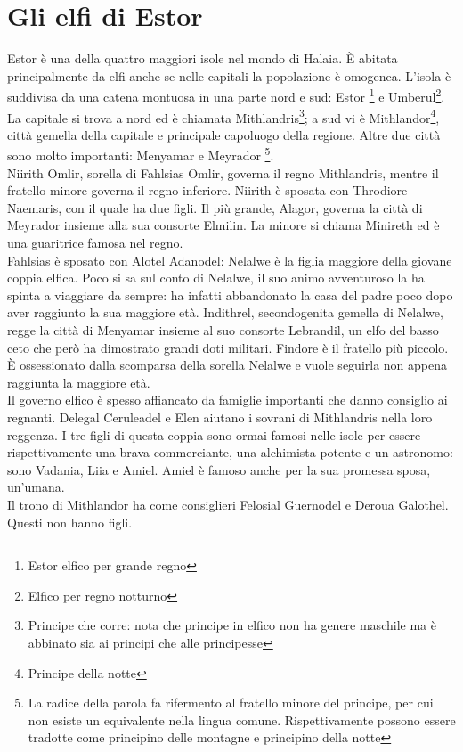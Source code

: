 \documentclass[10pt,twoside,twocolumn]{article}
\begin{document}
\section{Gli elfi di Estor}
Estor \`e una della quattro maggiori isole nel mondo di Halaia. \`E abitata
principalmente da elfi anche se nelle capitali la popolazione \`e omogenea.
L'isola \`e suddivisa da una catena montuosa in una parte nord e sud: Estor
\footnote{Estor elfico per grande regno}
e Umberul\footnote{Elfico per regno notturno}. La capitale si trova a nord
ed \`e chiamata Mithlandris\footnote{Principe che corre: nota che principe in elfico
non ha genere maschile ma \`e abbinato sia ai principi che alle principesse}; a sud
vi \`e Mithlandor\footnote{Principe della notte}, citt\`a gemella
della capitale e principale capoluogo della regione.
Altre due citt\`a sono molto importanti: Menyamar e Meyrador
\footnote{La radice della parola fa rifermento al fratello minore del
  principe, per cui non esiste un equivalente nella lingua comune.
  Rispettivamente possono essere tradotte come principino delle montagne
  e principino della notte}.\\
Niirith Omlir, sorella di Fahlsias Omlir, governa il regno Mithlandris, mentre
il fratello minore governa il regno inferiore.
Niirith \`e sposata con Throdiore Naemaris, con il quale ha due figli. Il pi\`u
grande, Alagor, governa la citt\`a di Meyrador insieme alla sua consorte Elmilin.
La minore si chiama Minireth ed \`e una guaritrice famosa nel regno.\\
Fahlsias \`e sposato con Alotel Adanodel: Nelalwe \`e la figlia maggiore della
giovane coppia elfica. Poco si sa sul conto di Nelalwe, il suo animo avventuroso la
ha spinta a viaggiare da sempre: ha infatti abbandonato la casa del padre poco
dopo aver raggiunto la sua maggiore et\`a.
Indithrel, secondogenita gemella di Nelalwe, regge la citt\`a di Menyamar insieme
al suo consorte Lebrandil, un elfo del basso ceto che per\`o ha dimostrato grandi
doti militari.
Findore \`e il fratello pi\`u piccolo. \`E ossessionato dalla scomparsa della sorella
Nelalwe e vuole seguirla non appena raggiunta la maggiore et\`a.\\
Il governo elfico \`e spesso affiancato da famiglie importanti che danno consiglio
ai regnanti. Delegal Ceruleadel e Elen aiutano i sovrani di Mithlandris nella loro
reggenza. I tre figli di questa coppia sono ormai famosi nelle isole per essere
rispettivamente una brava commerciante, una alchimista potente e un astronomo:
sono Vadania, Liia e Amiel. Amiel \`e famoso anche per la sua promessa sposa, un'umana.\\
Il trono di Mithlandor ha come consiglieri Felosial Guernodel e Deroua Galothel.
Questi non hanno figli.
\end{document}
